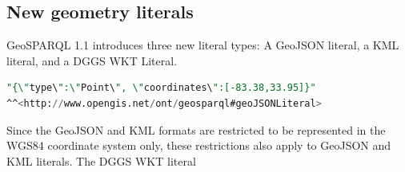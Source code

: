 \documentclass[runningheads]{llncs}
\begin{document}
\subsection{New geometry literals}\label{sec:literals}
GeoSPARQL 1.1 introduces three new literal types: A GeoJSON\cite{butler2016geojson} literal, a KML\cite{nolan2014keyhole} literal, and a DGGS\cite{sahr1998discrete} WKT Literal.
\small
\begin{lstlisting}[caption=GeoJSON literal example,label=lst:geojsonliteral,language=sql,frame=single,basicstyle=\ttfamily]
"{\"type\":\"Point\", \"coordinates\":[-83.38,33.95]}"
^^<http://www.opengis.net/ont/geosparql#geoJSONLiteral>
\end{lstlisting}
\normalsize
Since the GeoJSON and KML formats are restricted to be represented in the WGS84 coordinate system only, these restrictions also apply to GeoJSON and KML literals. The DGGS WKT literal  
\end{document}
